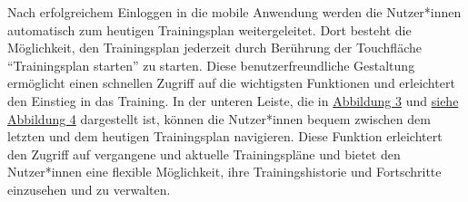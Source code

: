 Nach erfolgreichem Einloggen in die mobile Anwendung werden die Nutzer*innen automatisch zum heutigen Trainingsplan weitergeleitet. Dort besteht die Möglichkeit, den Trainingsplan jederzeit durch Berührung der Touchfläche {``Trainingsplan starten''} zu starten. Diese benutzerfreundliche Gestaltung ermöglicht einen schnellen Zugriff auf die wichtigsten Funktionen und erleichtert den Einstieg in das Training.
\newline
\newline
In der unteren Leiste, die in \hyperref[fig:main3]{Abbildung 3} und \hyperref[fig:main4]{siehe Abbildung 4} dargestellt ist, können die Nutzer*innen bequem zwischen dem letzten und dem heutigen Trainingsplan navigieren. Diese Funktion erleichtert den Zugriff auf vergangene und aktuelle Trainingspläne und bietet den Nutzer*innen eine flexible Möglichkeit, ihre Trainingshistorie und Fortschritte einzusehen und zu verwalten.

